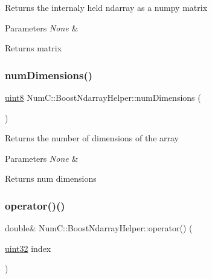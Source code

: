 Returns the internaly held ndarray as a numpy matrix


\begin{DoxyParams}{Parameters}
{\em None} & \\
\hline
\end{DoxyParams}
\begin{DoxyReturn}{Returns}
matrix 
\end{DoxyReturn}
\mbox{\label{class_num_c_1_1_boost_ndarray_helper_adbcf2213f2b5469b558c288ae18e4825}} 
\subsubsection{\texorpdfstring{num\+Dimensions()}{numDimensions()}}
{\footnotesize\ttfamily \mbox{\hyperlink{namespace_num_c_a60b2e2f49e1ff61059731c154e560869}{uint8}} Num\+C\+::\+Boost\+Ndarray\+Helper\+::num\+Dimensions (\begin{DoxyParamCaption}{ }\end{DoxyParamCaption})\hspace{0.3cm}{\ttfamily [inline]}}

Returns the number of dimensions of the array


\begin{DoxyParams}{Parameters}
{\em None} & \\
\hline
\end{DoxyParams}
\begin{DoxyReturn}{Returns}
num dimensions 
\end{DoxyReturn}
\mbox{\label{class_num_c_1_1_boost_ndarray_helper_a55c656e959263b99cd66d584c2218dc4}} 
\subsubsection{\texorpdfstring{operator()()}{operator()()}\hspace{0.1cm}{\footnotesize\ttfamily [1/3]}}
{\footnotesize\ttfamily double\& Num\+C\+::\+Boost\+Ndarray\+Helper\+::operator() (\begin{DoxyParamCaption}\item[{\mbox{\hyperlink{namespace_num_c_ae685802ca6d3035f2b400b081e3953fa}{uint32}}}]{index }\end{DoxyParamCaption})\hspace{0.3cm}{\ttfamily [inline]}}

